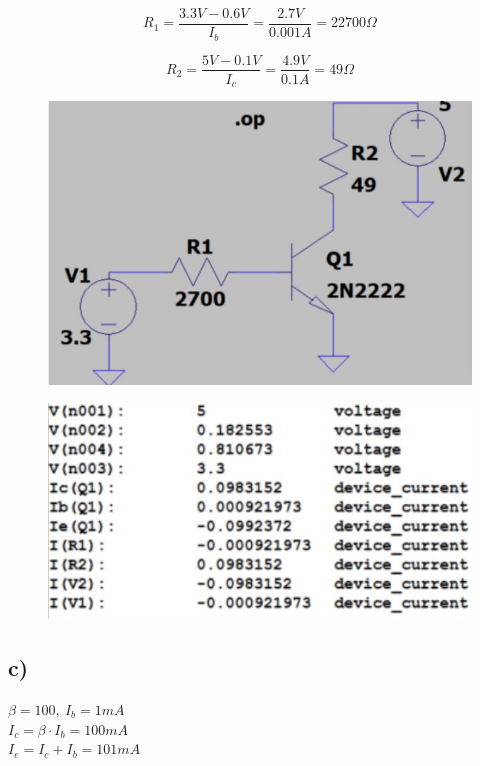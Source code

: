 \documentclass{article}
\begin{document}
$$
    R_{1}=\frac{3.3V-0.6V}{I_{b}}=\frac{2.7V}{0.001A}=22700\Omega
$$

$$
    R_{2}=\frac{5V-0.1V}{I_{c}}=\frac{4.9V}{0.1A}=49\Omega
$$

\begin{figure}[h!]
    \centering
    \includegraphics[scale=0.35]{rys4_model.jpg}
\end{figure}

\begin{figure}[h!]
    \centering
    \includegraphics[scale=0.5]{rys4_num.jpg}
\end{figure}

\newpage

\subsection{c)}

$\beta = 100, \ I_{b} = 1mA$\\
$I_{c}=\beta \cdot I_{b} = 100mA$\\
$I_{e}=I_{c}+I_{b}=101mA$
\end{document}
